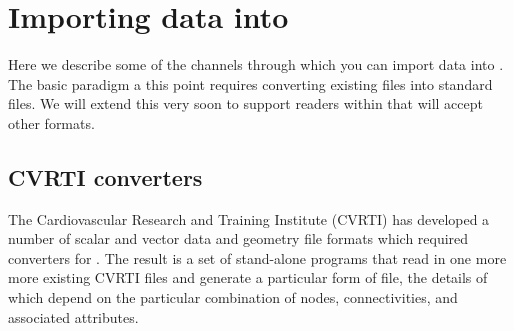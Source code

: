 %
%
%
%
%

\section{Importing data into \sr{}}
\label{sec:import} 

Here we describe some of the channels through which you can import data
into \sr{}.  The basic paradigm a this point requires converting existing
files into standard \sr{} files.  We will extend this very soon to support
readers within \sr{} that will accept other formats.


\subsection{CVRTI converters}

The Cardiovascular Research and Training Institute (CVRTI) has developed a
number of scalar and vector data and geometry file formats which required
converters for \sr{}.  The result is a set of stand-alone programs that read
in one more more existing CVRTI files and generate a particular form of
\sr{} file, the details of which depend on the particular combination of
nodes, connectivities, and associated attributes.

